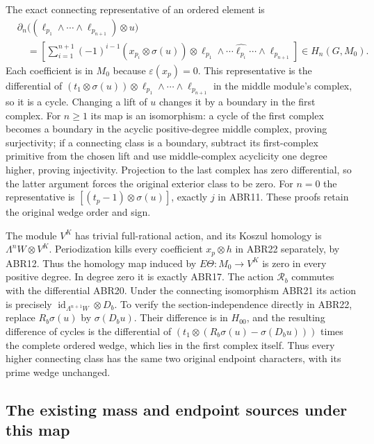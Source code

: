 The exact connecting representative of an ordered element is
\begin{equation}\tag{ABR22}
 \begin{split}
 &\partial_n\bigl((\ell_{p_1}\wedge\cdots\wedge\ell_{p_{n+1}})
                                                    \otimes u\bigr)\\
 &\quad=\left[
  \sum_{i=1}^{n+1}(-1)^{i-1}
       (x_{p_i}\otimes\sigma(u))\otimes
       \ell_{p_1}\wedge\cdots\widehat{\ell_{p_i}}\cdots
                                  \wedge\ell_{p_{n+1}}
         \right]\in H_n(G,M_0).
 \end{split}
\end{equation}
Each coefficient is in $M_0$ because $\varepsilon(x_p)=0$.
This representative is the differential of
$(t_1\otimes\sigma(u))\otimes
  \ell_{p_1}\wedge\cdots\wedge\ell_{p_{n+1}}$
in the middle module's complex, so it is a cycle. Changing a
lift of $u$ changes it by a boundary in the first complex.
For $n\ge1$ its map is an isomorphism: a cycle of the first
complex becomes a boundary in the acyclic positive-degree middle
complex, proving surjectivity; if a connecting class is a boundary,
subtract its first-complex primitive from the chosen lift and use
middle-complex acyclicity one degree higher, proving injectivity.
Projection to the last complex has zero differential, so the latter
argument forces the original exterior class to be zero. For $n=0$
the representative is $[(t_p-1)\otimes\sigma(u)]$, exactly $j$ in
ABR11. These proofs retain the original wedge order and sign.

The module $V^K$ has trivial full-rational action, and its Koszul
homology is $\Lambda^nW\otimes V^K$. Periodization kills every
coefficient $x_p\otimes h$ in ABR22 separately, by ABR12. Thus
the homology map induced by $E\Theta:M_0\to V^K$ is zero in
every positive degree. In degree zero it is exactly ABR17.
The action $\mathscr R_b$ commutes with the differential ABR20.
Under the connecting isomorphism ABR21 its action is precisely
$\operatorname{id}_{\Lambda^{n+1}W}\otimes D_b$. To verify the
section-independence directly in ABR22, replace $R_b\sigma(u)$
by $\sigma(D_bu)$. Their difference is in $H_{00}$, and the
resulting difference of cycles is the differential of
$(t_1\otimes(R_b\sigma(u)-\sigma(D_bu)))$
times the complete ordered wedge, which lies in the first
complex itself. Thus every higher connecting class has the same
two original endpoint characters, with its prime wedge unchanged.

\subsection{The existing mass and endpoint sources under this map}

